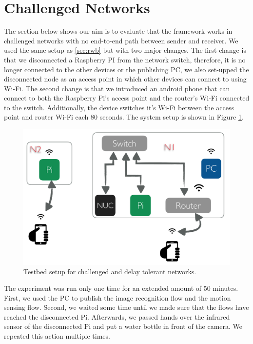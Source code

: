 \section{Challenged Networks}
The section below shows our aim is to evaluate that the framework works in challenged networks with no end-to-end path between  sender and receiver. We used the same setup as \ref{sec:rwb} but with two major changes. The first change is that we disconnected  a Raspberry PI from the network switch, therefore, it is no longer connected to the other devices or the publishing PC, we also set-upped the disconnected node as an access point in which other devices can connect to using Wi-Fi. The second change is that we introduced an android phone that can connect to both the Raspberry Pi's access point and the router's Wi-Fi connected to the switch. Additionally, the device switches it's Wi-Fi between the access point and router Wi-Fi each 80 seconds. The system setup is shown in Figure \ref{fig:tb-dtn}.
\begin{figure}[H]
	\centering
	\includegraphics[scale=0.6]{images/tb-dtn.png}
	\caption{Testbed setup for challenged and delay tolerant networks.}
	\label{fig:tb-dtn}
\end{figure} 

\noindent The experiment was run only one time for an extended amount of 50 minutes. First, we used the PC to publish the image recognition flow and the motion sensing flow. Second, we waited some time until we made sure that the flows have reached the disconnected Pi. Afterwards, we passed hands over the infrared sensor of the disconnected Pi and put a water bottle in front of the camera. We repeated this action multiple times.\\

